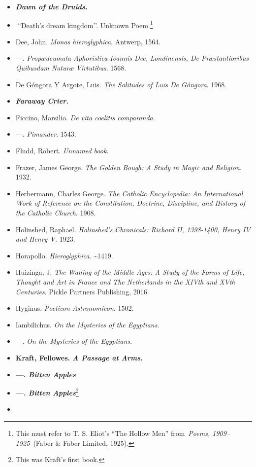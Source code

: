 \documentclass[12pt]{article}
\begin{document}
\begin{itemize}
  \emph{Das Nibelungenlied: Song of the Nibelungs}. Yale UP, 2006.
\item
  \textbf{\emph{Dawn of the Druids}.}
\item
  \emph``{Death's dream kingdom}''. Unknown Poem.\footnote{This must refer to T. S. Eliot's ``The Hollow Men'' from~\emph{Poems, 1909--1925}~(Faber \& Faber Limited, 1925).}
\item
  Dee, John. \emph{Monas hieroglyphica}. Antwerp, 1564.
\item
  \! ---. \emph{Propædeumata Aphoristica Ioannis Dee, Londinensis, De Præstantioribus Quibusdam Naturæ Virtutibus}. 1568.
\item
  De Góngora Y Argote, Luis. \emph{The Solitudes of Luis De Góngora}. 1968.
\item
  \textbf{\emph{Faraway Crier.}}
\item
  Ficcino, Marsilio. \emph{De vita coelitis comparanda}.
\item
  \! ---. \emph{Pimander}. 1543.
\item
  Fludd, Robert. \emph{Unnamed book}.
\item
  Frazer, James George. \emph{The Golden Bough: A Study in Magic and Religion}. 1932.
\item
  Herbermann, Charles George. \emph{The Catholic Encyclopedia: An International Work of Reference on the Constitution, Doctrine, Discipline, and History of the Catholic Church}. 1908.
\item
  Holinshed, Raphael. \emph{Holinshed's Chronicals: Richard II, 1398-1400, Henry IV and Henry V.} 1923.
\item
  Horapollo. \emph{Hieroglyphica}. \textasciitilde1419.
\item
  Huizinga, J. \emph{The Waning of the Middle Ages: A Study of the Forms of Life, Thought and Art in France and The Netherlands in the XIVth and XVth Centuries}. Pickle Partners Publishing, 2016.
\item
  Hyginus. \emph{Poeticon Astronomicon}. 1502.
\item
  Iambilichus. \emph{On the Mysteries of the Egyptians}.
\item
  \! ---. \emph{On the Mysteries of the Egyptians}.
\item
  \textbf{Kraft, Fellowes. \emph{A Passage at Arms}.}
\item
  \textbf{---. \emph{Bitten Apples}}
\item
  \textbf{---. \emph{Bitten Apples}}\footnote{This was Kraft's first book.}
\item

\end{itemize}
\end{document}
